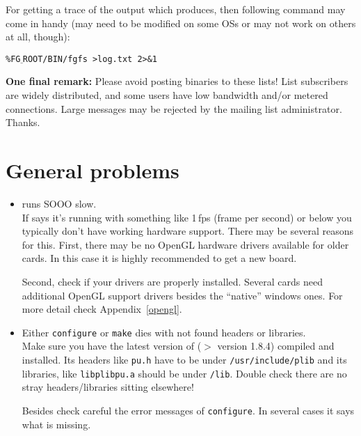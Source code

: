 For getting a trace of the output which \FlightGear{} produces, then following command may come in handy (may need to be modified on some OSs or may not work on others at all, though):
\medskip

\texttt{\%FG$\underline{~}$ROOT/BIN/fgfs >log.txt 2>\&1}
\medskip

\textbf{One final remark:} Please avoid posting binaries to these lists! List subscribers are widely distributed, and some users have low bandwidth and/or metered connections. Large messages may be rejected by the mailing list administrator. Thanks.

\section{General problems}
\begin{itemize}

\item{\FlightGear{} runs SOOO slow.}\\
 If \FlightGear{} says it's running with something like 1\,fps
 (frame per second) or below you typically don't have working hardware
  support. There may be several reasons for this. First,
 there may be no OpenGL hardware drivers available for older
 cards. In this case it is highly recommended to get a new board.

 Second, check if your drivers are properly installed. Several
 cards need additional OpenGL support drivers besides the
 ``native'' windows ones. For more detail check Appendix~\ref{opengl}.

\item{Either \texttt{configure} or \texttt{make} dies with not found \PLIB{} headers or
 libraries.}\\
  Make sure you have the latest version of \PLIB{} ($>$ version 1.8.4) compiled and installed.
  Its headers like \texttt{pu.h} have to be under \texttt{/usr/include/plib} and its libraries, like \texttt{libplibpu.a} should be under \texttt{/lib}. Double check there are no stray \PLIB{} headers/libraries sitting elsewhere!

  Besides check careful the error messages of \texttt{configure}. In several cases it
  says what is missing.
 \end{itemize}

